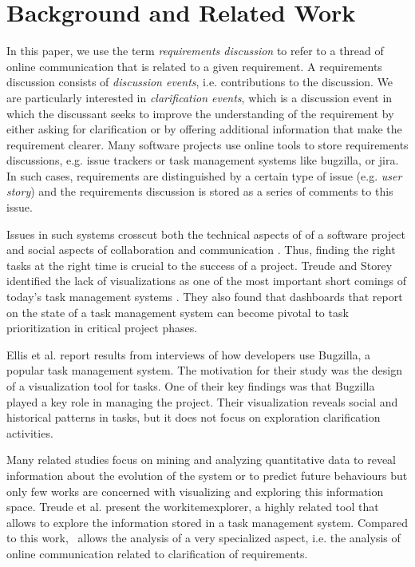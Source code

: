 \section{Background and Related Work}
In this paper, we use the term \emph{requirements discussion} to refer to a thread of online communication that is related to a given requirement. 
A requirements discussion consists of \emph{discussion events}, i.e. contributions to the discussion.
We are particularly interested in \emph{clarification events}, which is a discussion event in which the discussant seeks to improve the understanding of the requirement by either asking for clarification or by offering additional information that make the requirement clearer.
Many software projects use online tools to store requirements discussions, e.g. issue trackers or task management systems like bugzilla, or jira. 
In such cases, requirements are distinguished by a certain type of issue (e.g. \emph{user story}) and the requirements discussion is stored as a series of comments to this issue.

Issues in such systems crosscut both the technical aspects of of a software project and social aspects of collaboration and communication \cite{Kraut1995}. 
Thus, finding the right tasks at the right time is crucial to the success of a project.
Treude and Storey identified the lack of visualizations as one of the most important short comings of today's task management systems \cite{Treude2010}. They also found that dashboards that report on the state of a task management system can become pivotal to task prioritization in critical project phases.

Ellis et al. \cite{Ellis2007} report results from interviews of how developers use Bugzilla, a popular task management system. 
The motivation for their study was the design of a visualization tool for tasks. 
One of their key findings was that Bugzilla played a key role in managing the project. 
Their visualization reveals social and historical patterns in tasks, but it does not focus on exploration clarification activities.

Many related studies focus on mining and analyzing quantitative data to reveal information about the evolution of the system or to predict future behaviours but only few works are concerned with visualizing and exploring this information space. 
Treude et al. \cite{Treude2012} present the workitemexplorer, a highly related tool that allows to explore the information stored in a task management system.
Compared to this work, \viss\ allows the analysis of a very specialized aspect, i.e. the analysis of online communication related to clarification of requirements. 